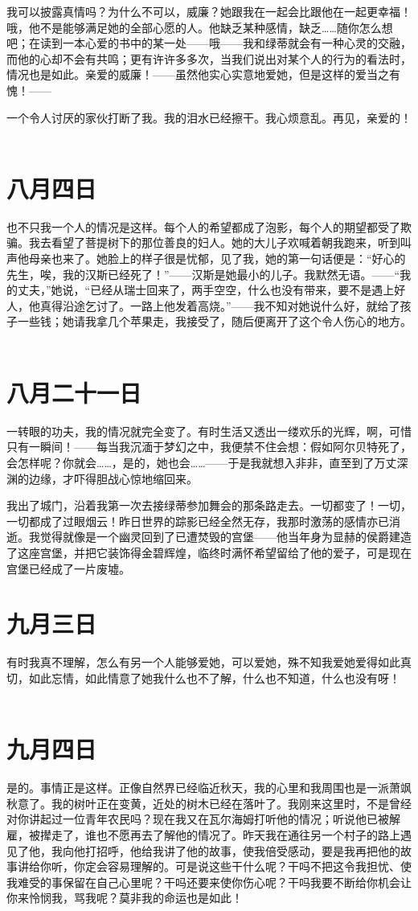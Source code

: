\documentclass[12pt,oneside]{book}
\begin{document}
我可以披露真情吗？为什么不可以，威廉？她跟我在一起会比跟他在一起更幸福！哦，他不是能够满足她的全部心愿的人。他缺乏某种感情，缺乏……随你怎么想吧；在读到一本心爱的书中的某一处——哦——我和绿蒂就会有一种心灵的交融，而他的心却不会有共鸣；更有许许多多次，当我们说出对某个人的行为的看法时，情况也是如此。亲爱的威廉！——虽然他实心实意地爱她，但是这样的爱当之有愧！——

一个令人讨厌的家伙打断了我。我的泪水已经擦干。我心烦意乱。再见，亲爱的！
　　
\chapter{八月四日}
\label{sec-4-9}
也不只我一个人的情况是这样。每个人的希望都成了泡影，每个人的期望都受了欺骗。我去看望了菩提树下的那位善良的妇人。她的大儿子欢喊着朝我跑来，听到叫声他母亲也来了。她脸上的样子很是忧郁，见了我，她的第一句话便是：“好心的先生，唉，我的汉斯已经死了！”——汉斯是她最小的儿子。我默然无语。——“我的丈夫，”她说，“已经从瑞士回来了，两手空空，什么也没有带来，要不是遇上好人，他真得沿途乞讨了。一路上他发着高烧。”——我不知对她说什么好，就给了孩子一些钱；她请我拿几个苹果走，我接受了，随后便离开了这个令人伤心的地方。
　　

\chapter{八月二十一日}
\label{sec-4-10}
一转眼的功夫，我的情况就完全变了。有时生活又透出一缕欢乐的光辉，啊，可惜只有一瞬间！——每当我沉湎于梦幻之中，我便禁不住会想：假如阿尔贝特死了，会怎样呢？你就会……，是的，她也会……——于是我就想入非非，直至到了万丈深渊的边缘，才吓得胆战心惊地缩回来。

我出了城门，沿着我第一次去接绿蒂参加舞会的那条路走去。一切都变了！一切，一切都成了过眼烟云！昨日世界的踪影已经全然无存，我那时激荡的感情亦已消逝。我觉得就像是一个幽灵回到了已遭焚毁的宫堡——他当年身为显赫的侯爵建造了这座宫堡，并把它装饰得金碧辉煌，临终时满怀希望留给了他的爱子，可是现在宫堡已经成了一片废墟。
　　
\chapter{九月三日}
\label{sec-4-11}
有时我真不理解，怎么有另一个人能够爱她，可以爱她，殊不知我爱她爱得如此真切，如此忘情，如此情意了她我什么也不了解，什么也不知道，什么也没有呀！
　　

\chapter{九月四日}
\label{sec-4-12}
是的。事情正是这样。正像自然界已经临近秋天，我的心里和我周围也是一派萧飒秋意了。我的树叶正在变黄，近处的树木已经在落叶了。我刚来这里时，不是曾经对你讲起过一位青年农民吗？现在我又在瓦尔海姆打听他的情况；听说他已被解雇，被撵走了，谁也不愿再去了解他的情况了。昨天我在通往另一个村子的路上遇见了他，我向他打招呼，他给我讲了他的故事，使我倍受感动，要是我再把他的故事讲给你听，你定会容易理解的。可是说这些干什么呢？干吗不把这令我担忧、使我难受的事保留在自己心里呢？干吗还要来使你伤心呢？干吗我要不断给你机会让你来怜悯我，骂我呢？莫非我的命运也是如此！
\end{document}

